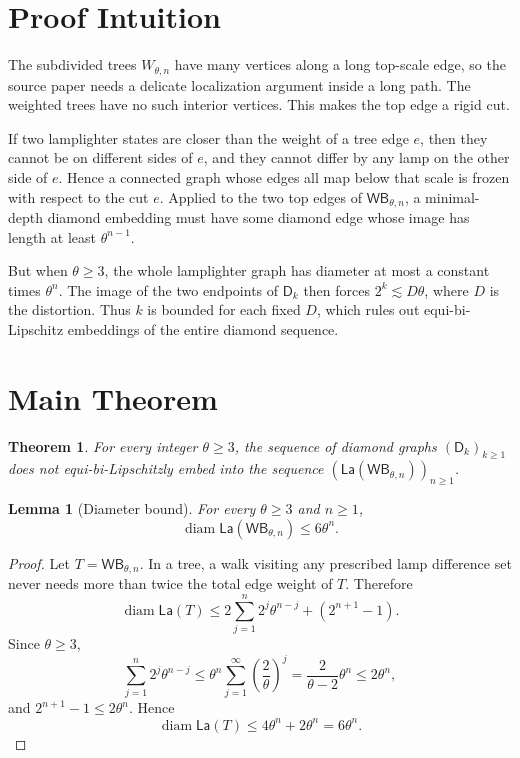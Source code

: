 \documentclass[11pt]{article}
\newtheorem{theorem}{Theorem}
\newtheorem{lemma}{Lemma}
\newcommand{\D}{\mathsf D}
\newcommand{\Lam}{\mathsf{La}}
\newcommand{\WB}{\mathsf{WB}}
\newcommand{\diam}{\operatorname{diam}}
\begin{document}
\section*{Proof Intuition}

The subdivided trees \(W_{\theta,n}\) have many vertices along a long top-scale
edge, so the source paper needs a delicate localization argument inside a long
path. The weighted trees have no such interior vertices. This makes the top
edge a rigid cut.

If two lamplighter states are closer than the weight of a tree edge \(e\), then
they cannot be on different sides of \(e\), and they cannot differ by any lamp
on the other side of \(e\). Hence a connected graph whose edges all map below
that scale is frozen with respect to the cut \(e\). Applied to the two top
edges of \(\WB_{\theta,n}\), a minimal-depth diamond embedding must have some
diamond edge whose image has length at least \(\theta^{n-1}\).

But when \(\theta\geq 3\), the whole lamplighter graph has diameter at most a
constant times \(\theta^n\). The image of the two endpoints of \(\D_k\) then
forces \(2^k\lesssim D\theta\), where \(D\) is the distortion. Thus \(k\) is
bounded for each fixed \(D\), which rules out equi-bi-Lipschitz embeddings of
the entire diamond sequence.

\section*{Main Theorem}

\begin{theorem}
\label{thm:weighted-no-diamonds}
For every integer \(\theta\geq 3\), the sequence of diamond graphs
\((\D_k)_{k\geq 1}\) does not equi-bi-Lipschitzly embed into the sequence
\((\Lam(\WB_{\theta,n}))_{n\geq 1}\).
\end{theorem}

\begin{lemma}[Diameter bound]
\label{lem:diameter}
For every \(\theta\geq 3\) and \(n\geq 1\),
\[
  \diam \Lam(\WB_{\theta,n}) \leq 6\theta^n .
\]
\end{lemma}

\begin{proof}
Let \(T=\WB_{\theta,n}\). In a tree, a walk visiting any prescribed lamp
difference set never needs more than twice the total edge weight of \(T\).
Therefore
\[
  \diam\Lam(T)
  \leq 2\sum_{j=1}^n 2^j\theta^{n-j} + (2^{n+1}-1).
\]
Since \(\theta\geq 3\),
\[
  \sum_{j=1}^n 2^j\theta^{n-j}
  \leq \theta^n\sum_{j=1}^{\infty}\left(\frac2\theta\right)^j
  =
  \frac{2}{\theta-2}\theta^n
  \leq 2\theta^n,
\]
and \(2^{n+1}-1\leq 2\theta^n\). Hence
\[
  \diam\Lam(T)\leq 4\theta^n+2\theta^n=6\theta^n .
\]
\end{proof}
\end{document}
